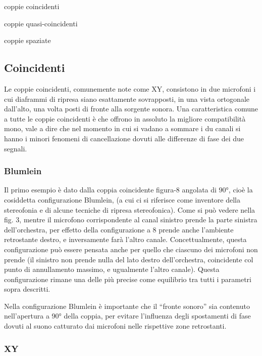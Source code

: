 \begin{compactitem}
\item coppie coincidenti
\item coppie quasi-coincidenti
\item coppie spaziate
\end{compactitem}

\subsection{Coincidenti}

Le coppie coincidenti, comunemente note come XY, consistono in due microfoni i
cui diaframmi di ripresa siano esattamente sovrapposti, in una vista ortogonale
dall’alto, una volta posti di fronte alla sorgente sonora. Una caratteristica
comune a tutte le coppie coincidenti è che offrono in assoluto la migliore
compatibilità mono, vale a dire che nel momento in cui si vadano a sommare i du
canali si hanno i minori fenomeni di cancellazione dovuti alle differenze di fase
dei due segnali.

\subsubsection{Blumlein}

Il primo esempio è dato dalla coppia coincidente figura-8 angolata di $90°$,
cioè la cosiddetta configurazione Blumlein, (a cui ci si riferisce come
inventore della stereofonia e di alcune tecniche di ripresa stereofonica). Come
si può vedere nella fig. 3, mentre il microfono corrispondente al canal
sinistro prende la parte sinistra dell’orchestra, per effetto della configurazione
a 8 prende anche l’ambiente retrostante destro, e inversamente farà l’altro canale.
Concettualmente, questa configurazione può essere pensata anche per quello che
ciascuno dei microfoni non prende (il sinistro non prende nulla del lato destro
dell’orchestra, coincidente col punto di annullamento massimo, e ugualmente
l’altro canale). Questa configurazione rimane una delle più precise come
equilibrio tra tutti i parametri sopra descritti.

Nella configurazione Blumlein è importante che il “fronte sonoro” sia contenuto
nell’apertura a 90° della coppia, per evitare l’influenza degli spostamenti di
fase dovuti al suono catturato dai microfoni nelle rispettive zone retrostanti.

\subsubsection{XY}

